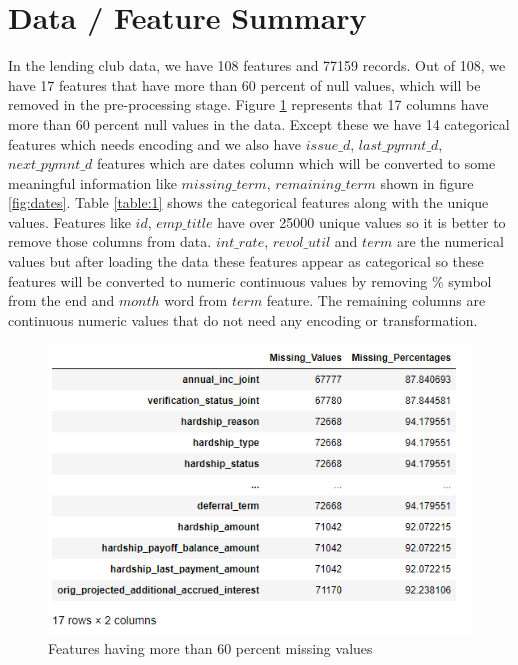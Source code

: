 \documentclass[12pt]{article}
\begin{document}
\section{Data / Feature Summary} 
In the lending club data, we have 108 features and 77159 records. Out of 108, we have 17 features that have more than 60 percent of null values, which will be removed in the pre-processing stage. Figure \ref{fig:MissingValues} represents that 17 columns have more than 60 percent null values in the data. Except these we have 14 categorical features which needs encoding and we also have  $issue\_d$, $last\_pymnt\_d$, $next\_pymnt\_d$ features which are dates column which will be converted to some meaningful information like $missing\_term$, $remaining\_term$ shown in figure \ref{fig:dates}. Table \ref{table:1} shows the categorical features along with the unique values. Features like $id$, $emp\_title$ have over 25000 unique values so it is better to remove those columns from data. $int\_rate$, $revol\_util$ and $term$ are the numerical values but after loading the data these features appear as categorical so these features will be converted to numeric continuous values by removing $\%$ symbol from the end and $month$ word from $term$ feature. The remaining columns are continuous numeric values that do not need any encoding or transformation.
\begin{figure}[h!]
	\centering
	\includegraphics{MissingValues.png}
	\caption{Features having more than 60 percent missing values}
	\label{fig:MissingValues}
\end{figure}
 
\end{document}
